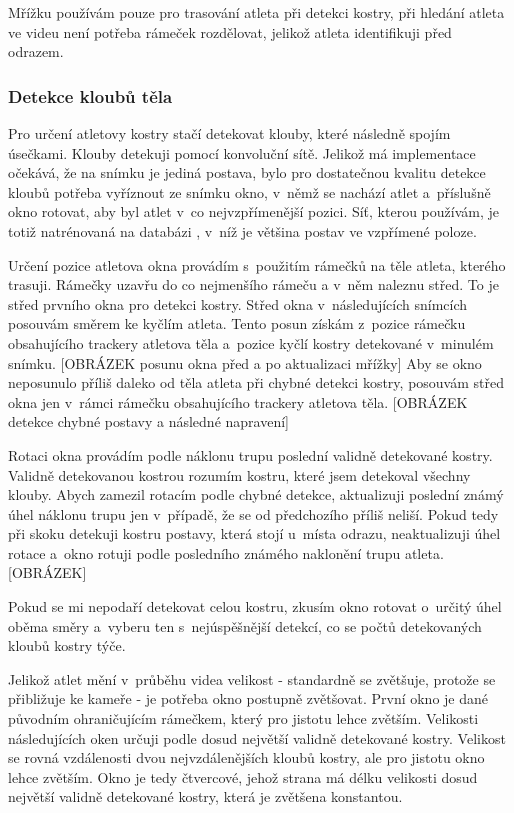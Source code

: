 Mřížku používám pouze pro trasování atleta při detekci kostry, při hledání atleta ve videu není potřeba rámeček rozdělovat, jelikož atleta identifikuji před odrazem.

\subsubsection{Detekce kloubů těla}
\label{sssec:trasovanidetekce}

Pro určení atletovy kostry stačí detekovat klouby, které následně spojím úsečkami. Klouby detekuji pomocí konvoluční sítě. Jelikož má implementace očekává, že na snímku je jediná postava, bylo pro dostatečnou kvalitu detekce kloubů potřeba vyříznout ze snímku okno, v~němž se nachází atlet a~příslušně okno rotovat, aby byl atlet v~co nejvzpřímenější pozici. Síť, kterou používám, je totiž natrénovaná na databázi \citep{MPIIHPE}, v~níž je většina postav ve vzpřímené poloze.

Určení pozice atletova okna provádím s~použitím rámečků na těle atleta, kterého trasuji. Rámečky uzavřu do co nejmenšího rámeču a v~něm naleznu střed. To je střed prvního okna pro detekci kostry. Střed okna v~následujících snímcích posouvám směrem ke kyčlím atleta. Tento posun získám z~pozice rámečku obsahujícího trackery atletova těla a~pozice kyčlí kostry detekované v~minulém snímku. [OBRÁZEK posunu okna před a po aktualizaci mřížky] Aby se okno neposunulo příliš daleko od těla atleta při chybné detekci kostry, posouvám střed okna jen v~rámci rámečku obsahujícího trackery atletova těla. [OBRÁZEK detekce chybné postavy a následné napravení]

Rotaci okna provádím podle náklonu trupu poslední validně detekované kostry. Validně detekovanou kostrou rozumím kostru, které jsem detekoval všechny klouby. Abych zamezil rotacím podle chybné detekce, aktualizuji poslední známý úhel náklonu trupu jen v~případě, že se od předchozího příliš neliší. Pokud tedy při skoku detekuji kostru postavy, která stojí u~místa odrazu, neaktualizuji úhel rotace a~okno rotuji podle posledního známého naklonění trupu atleta. [OBRÁZEK]

Pokud se mi nepodaří detekovat celou kostru, zkusím okno rotovat o~určitý úhel oběma směry a~vyberu ten s~nejúspěšnější detekcí, co se počtů detekovaných kloubů kostry týče.

Jelikož atlet mění v~průběhu videa velikost - standardně se zvětšuje, protože se přibližuje ke kameře - je potřeba okno postupně zvětšovat. První okno je dané původním ohraničujícím rámečkem, který pro jistotu lehce zvětším. Velikosti následujících oken určuji podle dosud největší validně detekované kostry. Velikost se rovná vzdálenosti dvou nejvzdálenějších kloubů kostry, ale pro jistotu okno lehce zvětším. Okno je tedy čtvercové, jehož strana má délku velikosti dosud největší validně detekované kostry, která je zvětšena konstantou.

